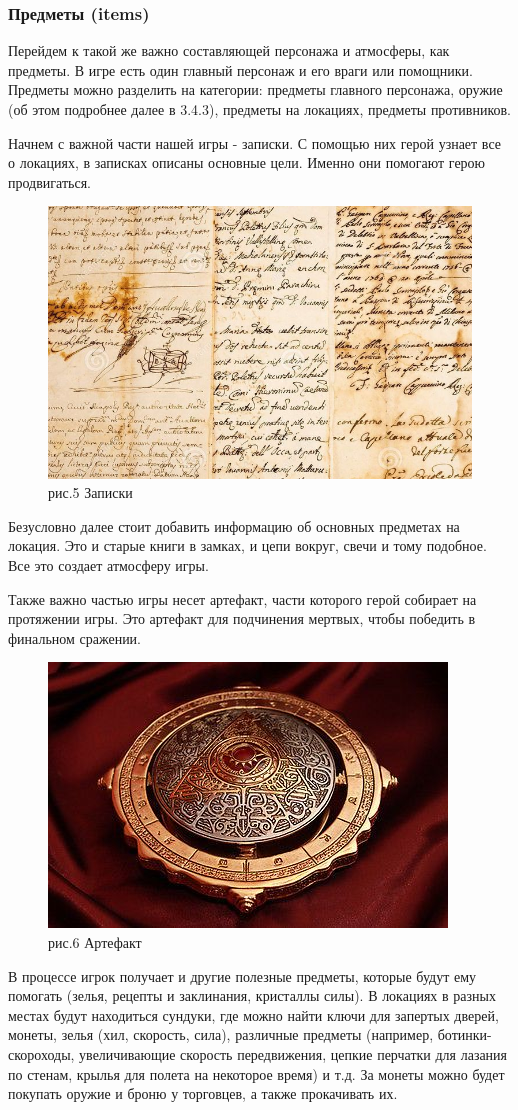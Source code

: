 \documentclass{article}
\begin{document}
\subsubsection{Предметы (items)}
\par Перейдем к такой же важно составляющей персонажа и атмосферы, как предметы. В игре есть один главный персонаж и его враги или помощники. Предметы можно разделить на категории: предметы главного персонажа, оружие (об этом подробнее далее в 3.4.3), предметы на локациях, предметы противников. 
\par Начнем с важной части нашей игры - записки. С помощью них герой узнает все о локациях, в записках описаны основные цели. Именно они помогают герою продвигаться. 
\begin{figure}[h]
    \centering
    \includegraphics[width=0.5\linewidth]{image4.png} \\ рис.5 Записки
    \label{fig:enter-label}
\end{figure}
\par Безусловно далее стоит добавить информацию об основных предметах на локация. Это и старые книги в замках, и цепи вокруг, свечи и тому подобное. Все это создает атмосферу игры. 
\par Также важно частью игры несет артефакт, части которого герой собирает на протяжении игры. Это артефакт для подчинения мертвых, чтобы победить в финальном сражении. 
\begin{figure}[h]
    \centering
    \includegraphics[width=0.5\linewidth]{image5.png} \\ рис.6 Артефакт
    \label{fig:enter-label}
\end{figure} 
\par В процессе игрок получает и другие полезные предметы, которые будут ему помогать (зелья, рецепты и заклинания, кристаллы силы). В локациях в разных местах будут находиться сундуки, где можно найти ключи для запертых дверей, монеты, зелья (хил, скорость, сила), различные предметы (например, ботинки-скороходы, увеличивающие скорость передвижения, цепкие перчатки для лазания по стенам, крылья для полета на некоторое время) и т.д. За монеты можно будет покупать оружие и броню у торговцев, а также прокачивать их. 
\end{document}
